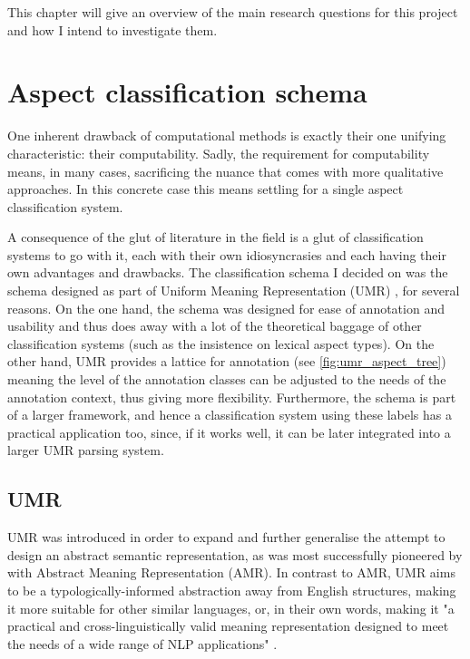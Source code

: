 This chapter will give an overview of the main research questions for this project and how I intend to investigate them.

\section{Aspect classification schema}
One inherent drawback of computational methods is exactly their one unifying characteristic: their computability. Sadly, the requirement for computability means, in many cases, sacrificing the nuance that comes with more qualitative approaches. In this concrete case this means settling for a single aspect classification system. 

A consequence of the glut of literature in the field is a glut of classification systems to go with it, each with their own idiosyncrasies and each having their own advantages and drawbacks. The classification schema I decided on was the schema designed as part of Uniform Meaning Representation (UMR) \citep{umr}, for several reasons. On the one hand, the schema was designed for ease of annotation and usability and thus does away with a lot of the theoretical baggage of other classification systems (such as the insistence on lexical aspect types). On the other hand, UMR provides a lattice for annotation (see \ref{fig:umr_aspect_tree}) meaning the level of the annotation classes can be adjusted to the needs of the annotation context, thus giving more flexibility. Furthermore, the schema is part of a larger framework, and hence a classification system using these labels has a practical application too, since, if it works well, it can be later integrated into a larger UMR parsing system.

\subsection{UMR}
\label{sect:umr}
UMR \citep{umr} was introduced in order to expand and further generalise the attempt to design an abstract semantic representation, as was most successfully pioneered by \citet{amr} with Abstract Meaning Representation (AMR). In contrast to AMR, UMR aims to be a typologically-informed abstraction away from English structures, making it more suitable for other similar languages, or, in their own words, making it "a practical and cross-linguistically valid meaning representation designed to meet the needs of a wide range of NLP applications" \citep{umr}.

